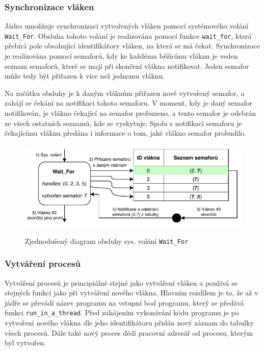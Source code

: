 \documentclass[12pt, a4paper]{article}
\begin{document}
\subsubsection{Synchronizace vláken}
Jádro umožňuje synchronizaci vytvořených vláken pomocí systémového volání \texttt{Wait\_For}. Obsluha tohoto volání je realizována pomocí funkce \texttt{wait\_for}, která přebírá pole obsahující identifikátory vláken, na která se má čekat. Synchronizace je realizována pomocí semaforů, kdy ke každému běžícímu vláknu je veden seznam semaforů, které se mají při skončení vlákna notifikovat. Jeden semafor může tedy být přiřazen k více než jednomu vláknu. 

Na začátku obsluhy je k daným vláknům přiřazen nově vytvořený semafor, a zahájí se čekání na notifikaci tohoto semaforu. V moment, kdy je daný semafor notifikován, je vlákno čekající na semafor probuzeno, a tento semafor je odebrán ze všech ostatních seznamů, kde se vyskytuje. Spolu s notifikací semaforu je čekajícímu vláknu předána i informace o tom, jaké vlákno semafor probudilo. 

\begin{figure}[!ht]
\centering
{\includegraphics[width=14.5cm]{pdf/wait_for.pdf}}
\caption{Zjednodušený diagram obsluhy sys. volání \texttt{Wait\_For}}
\label{fig:screen-transition-diagram}
\end{figure}

\subsubsection{Vytváření procesů}
Vytváření procesů je principiálně stejné jako vytváření vláken a používá se stejných funkcí jako při vytváření nového vlákna. Hlavním rozdílem je to, že až v jádře se převádí název programu na vstupní bod programu, který se předává funkci \texttt{run\_in\_a\_thread}. Před zahájením vykonávání kódu programu je po vytvoření nového vlákna dle jeho identifikátoru přidán nový záznam do tabulky všech procesů. Dále také nový proces dědí pracovní adresář od procesu, kterým byl vytvořen.
\end{document}
